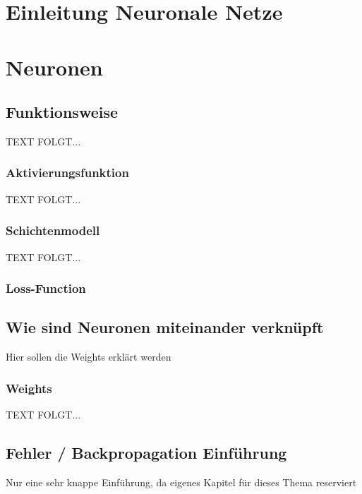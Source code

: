 \newpage
\thispagestyle{empty}
\section{Einleitung Neuronale Netze}\label{sec:einleitung_nn}   

\vspace{1cm}




\newpage  
\section{Neuronen}\label{sec:neuronen}
  
\newpage
\subsection{Funktionsweise}\label{subsec:neuronen:funktionsweise}
  TEXT FOLGT... 
 

\newpage
\subsubsection{Aktivierungsfunktion}\label{subsec:neuronen:aktivierungsfunktion}
  
  TEXT FOLGT... 


\newpage
\subsubsection{Schichtenmodell}\label{subsec:neuronen:schichtenmodell}
  TEXT FOLGT... 

\subsubsection{Loss-Function}

\newpage 
\subsection{Wie sind Neuronen miteinander verknüpft}\label{subsec:neuronen:verknuepfung_neuronen}  
%
Hier sollen die Weights erklärt werden

\subsubsection{Weights}\label{Weights}
  TEXT FOLGT... 

\subsection{Fehler / Backpropagation Einführung}\label{subsec:neuronen:fehler_backpropagation}
Nur eine sehr knappe Einführung, da eigenes Kapitel für dieses Thema reserviert

